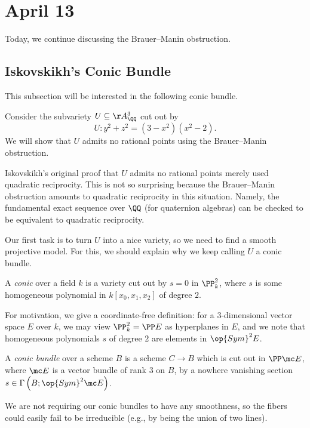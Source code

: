 \documentclass[../notes.tex]{subfiles}
\begin{document}
\section{April 13}
Today, we continue discussing the Brauer--Manin obstruction.

\subsection{Iskovskikh's Conic Bundle}
This subsection will be interested in the following conic bundle.
\begin{example}[Iskovskikh]
	Consider the subvariety $U\subseteq\AA_\QQ^3$ cut out by
	\[U\colon y^2+z^2=\left(3-x^2\right)\left(x^2-2\right).\]
	We will show that $U$ admits no rational points using the Brauer--Manin obstruction.
\end{example}
\begin{remark}
	Iskovskikh's original proof that $U$ admits no rational points merely used quadratic reciprocity. This is not so surprising because the Brauer--Manin obstruction amounts to quadratic reciprocity in this situation. Namely, the fundamental exact sequence over $\QQ$ (for quaternion algebras) can be checked to be equivalent to quadratic reciprocity.
\end{remark}
Our first task is to turn $U$ into a nice variety, so we need to find a smooth projective model. For this, we should explain why we keep calling $U$ a conic bundle.
\begin{definition}[conic]
	A \textit{conic} over a field $k$ is a variety cut out by $s=0$ in $\PP^2_k$, where $s$ is some homogeneous polynomial in $k[x_0,x_1,x_2]$ of degree $2$.
\end{definition}
\begin{remark}
	For motivation, we give a coordinate-free definition: for a $3$-dimensional vector space $E$ over $k$, we may view $\PP^2_k=\PP E$ as hyperplanes in $E$, and we note that homogeneous polynomials $s$ of degree $2$ are elements in $\op{Sym}^2E$.
\end{remark}
\begin{definition}
	A \textit{conic bundle} over a scheme $B$ is a scheme $C\to B$ which is cut out in $\PP\mc E$, where $\mc E$ is a vector bundle of rank $3$ on $B$, by a nowhere vanishing section $s\in\Gamma\left(B;\op{Sym}^2\mc E\right)$.
\end{definition}
\begin{remark}
	We are not requiring our conic bundles to have any smoothness, so the fibers could easily fail to be irreducible (e.g., by being the union of two lines).
\end{remark}
\end{document}

